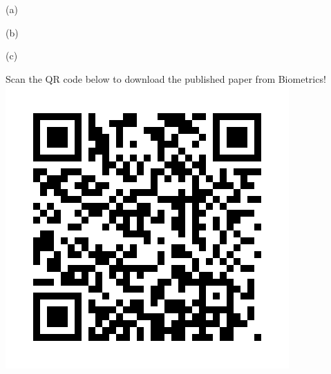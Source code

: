 \documentclass[a0,portrait]{a0poster}
\begin{document}
\begin{multicols}{2}
\begin{minipage}[c]{0.15\textwidth}
\end{minipage}

\begin{minipage}{0.15\textwidth}
\centering(a)
\end{minipage}
%
\begin{minipage}[c]{0.15\textwidth}
\centering(b)
\end{minipage}
%
\begin{minipage}[c]{0.15\textwidth}
\centering (c)
\end{minipage}


\end{multicols} 


\begin{minipage}[c]{0.85\linewidth}


\end{minipage}
\mbox{}
\begin{minipage}[c]{0.15\linewidth}
\centering
Scan the QR code below to download the published paper from Biometrics!
\includegraphics[scale=0.90]{biometrics}
\end{minipage}
\end{document}
